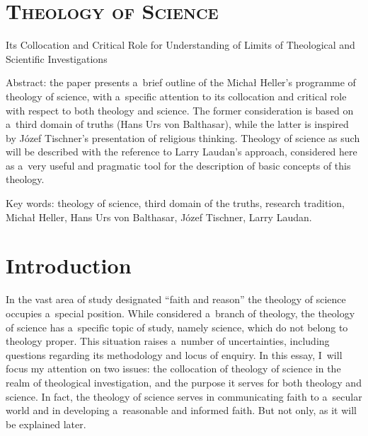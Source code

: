 \setcounter{secnumdepth}{0}







\section{\rmfamily\bfseries\scshape Theology of Science}

Its Collocation and Critical Role for Understanding of Limits of Theological and Scientific Investigations





Abstract: the paper presents a~brief outline of the Michał Heller's programme of theology of science, with a~specific attention to its collocation and critical role with respect to both theology and science. The former consideration is based on a~third domain of truths (Hans Urs von Balthasar), while the latter is inspired by Józef Tischner's presentation of religious thinking. Theology of science as such will be described with the reference to Larry Laudan's approach, considered here as a~very useful and pragmatic tool for the description of basic concepts of this theology.



Key words: theology of science, third domain of the truths, research tradition, Michał Heller, Hans Urs von Balthasar, Józef Tischner, Larry Laudan.



\section{Introduction }

In the vast area of study designated ``faith and reason'' the theology of science occupies a~special position. While considered a~branch of theology, the theology of science has a~specific topic of study, namely science, which do not belong to theology proper. This situation raises a~number of uncertainties, including questions regarding its methodology and locus of enquiry. In this essay, I~will focus my attention on two issues: the collocation of theology of science in the realm of theological investigation, and the purpose it serves for both theology and science. In fact, the theology of science serves in communicating faith to a~secular world and in developing a~reasonable and informed faith. But not only, as it will be explained later.



